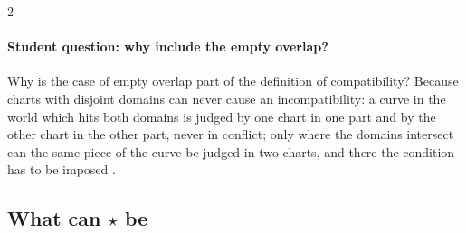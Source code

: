 \begin{paracol}{2}
\paragraph{Student question: why include the empty overlap?} Why is the case of empty overlap part of the definition of compatibility? Because charts with disjoint domains can never cause an incompatibility: a curve in the world which hits both domains is judged by one chart in one part and by the other chart in the other part, never in conflict;
only where the domains intersect can the same piece of the curve be judged in two charts, and there the condition has to be imposed .

\subsection{What can $\star$ be}


\end{paracol}
